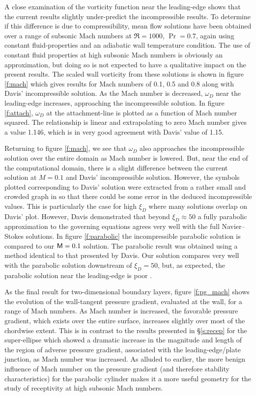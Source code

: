 A close examination of the vorticity function near the leading-edge shows that
the current results slightly under-predict the incompressible results.  To
determine if this difference is due to compressibility, mean flow solutions
have been obtained over a range of subsonic Mach numbers at $\Re=1000$,
$\Pr=0.7$, again using constant fluid-properties and an adiabatic wall
temperature condition.  The use of constant fluid properties at high subsonic
Mach numbers is obviously an approximation, but doing so is not expected to
have a qualitative impact on the present results.  The scaled wall vorticity
from these solutions is shown in figure \ref{f:mach} which gives results for
Mach numbers of 0.1, 0.5 and 0.8 along with Davis' incompressible solution.
As the Mach number is decreased, $\omega_D$ near the leading-edge increases,
approaching the incompressible solution.  In figure \ref{f:attach}, $\omega_D$
at the attachment-line is plotted as a function of Mach number squared.  The
relationship is linear and extrapolating to zero Mach number gives a value
1.146, which is in very good agreement with Davis' value of 1.15.

Returning to figure \ref{f:mach}, we see that $\omega_D$ also approaches the
incompressible solution over the entire domain as Mach number is lowered.
But, near the end of the computational domain, there is a slight difference
between the current solution at $M=0.1$ and Davis' incompressible solution.
However, the symbols plotted corresponding to Davis' solution were extracted
from a rather small and crowded graph in \cite{Davis:72} so that there could
be some error in the deduced incompressible values.  This is particularly the
case for high $\xi_D$ where many solutions overlap on Davis' plot.  However,
Davis demonstrated that beyond $\xi_D \approx 50$ a fully parabolic
approximation to the governing equations agrees very well with the full
Navier--Stokes solutions.  In figure \ref{f:parabolic} the incompressible
parabolic solution is compared to our ${\sf M}=0.1$ solution.  The parabolic result
was obtained using a method identical to that presented by Davis.  Our
solution compares very well with the parabolic solution downstream of $\xi_D =
50$, but, as expected, the parabolic solution near the leading-edge is poor
\cite{Davis:72}.

As the final result for two-dimensional boundary layers, figure
\ref{f:pg_mach} shows the evolution of the wall-tangent pressure gradient,
evaluated at the wall, for a range of Mach numbers.  As Mach number is
increased, the favorable pressure gradient, which exists over the entire
surface, increases slightly over most of the chordwise extent.  This is in
contrast to the results presented in \S\ref{s:recep} for the super-ellipse
which showed a dramatic increase in the magnitude and length of the region of
adverse pressure gradient, associated with the leading-edge/plate junction, as
Mach number was increased.  As alluded to earlier, the more benign influence
of Mach number on the pressure gradient (and therefore stability
characteristics) for the parabolic cylinder makes it a more useful geometry
for the study of receptivity at high subsonic Mach numbers.

